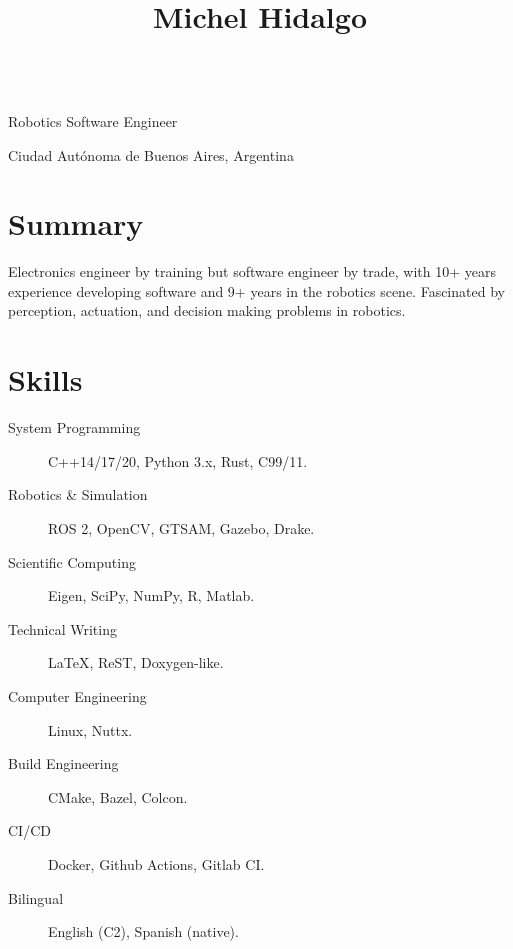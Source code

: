 \documentclass[english, letterpaper]{resume}
\begin{document}
\begin{center}
  \title{Michel Hidalgo} \\
  Robotics Software Engineer \\
  \address{Buenos Aires}{
    Ciudad Autónoma de Buenos Aires,
    Argentina} \\
  \begin{inlined}
    \item {}
    \item {}
    \item {}
  \end{inlined}
\end{center}

\section*{Summary}

Electronics engineer by training but software engineer by trade, with 10+ years experience developing software and 9+ years in the robotics scene. Fascinated by perception, actuation, and decision making problems in robotics.

\section*{Skills}

\hfill
\begin{minipage}{0.55\linewidth}
  \begin{description}
    \item[System Programming] C++14/17/20, Python 3.x, Rust, C99/11.
    \item[Robotics \& Simulation] ROS 2, OpenCV, GTSAM, Gazebo, Drake.
    \item[Scientific Computing] Eigen, SciPy, NumPy, R, Matlab.
    \item[Technical Writing] La\TeX, ReST, Doxygen-like.
  \end{description}
\end{minipage}\hfill
\begin{minipage}{0.4\linewidth}
  \begin{description}
    \item[Computer Engineering] Linux, Nuttx.
    \item[Build Engineering] CMake, Bazel, Colcon.
    \item[CI/CD] Docker, Github Actions, Gitlab CI.\@
    \item[Bilingual] English (C2), Spanish (native).
  \end{description}
\end{minipage}
\hfill
\end{document}
